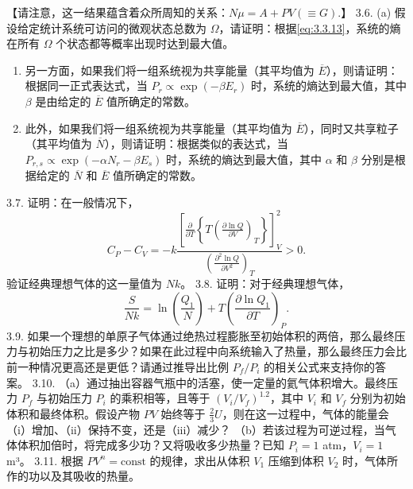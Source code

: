 【请注意，这一结果蕴含着众所周知的关系：\(N\mu = A + PV(\equiv G).\)】
3.6. (a) 假设给定统计系统可访问的微观状态总数为 \(\Omega\)，请证明：根据\autoref{eq:3.3.13}，系统的熵在所有 \(\Omega\) 个状态都等概率出现时达到最大值。
\begin{enumerate}
\def\labelenumi{(\alph{enumi})}
\setcounter{enumi}{1}
\item
  另一方面，如果我们将一组系统视为共享能量（其平均值为 \(\overline{E}\)），则请证明：根据同一正式表达式，当 \(P_{r} \propto \exp(-\beta E_{r})\) 时，系统的熵达到最大值，其中 \(\beta\) 是由给定的 \(\overline{E}\) 值所确定的常数。
\item
  此外，如果我们将一组系统视为共享能量（其平均值为 \(\overline{E}\)），同时又共享粒子（其平均值为 \(\overline{N}\)），则请证明：根据类似的表达式，当 \(P_{r,s} \propto \exp(-\alpha N_{r}-\beta E_{s})\) 时，系统的熵达到最大值，其中 \(\alpha\) 和 \(\beta\) 分别是根据给定的 \(\overline{N}\) 和 \(\overline{E}\) 值所确定的常数。
\end{enumerate}
3.7. 证明：在一般情况下，
\begin{equation}\tag{3.5.122}\label{eq:3.5.122}
C _ { P } - C _ { V } = - k \frac { \left[ \frac { \partial } { \partial T } \left\{ T \left( \frac { \partial \ln Q } { \partial V } \right) _ { T } \right\} \right] _ { V } ^{2} } { \left( \frac { \partial ^{2} \ln Q } { \partial V ^{2} } \right) _ { T } } > 0 .
\end{equation}
验证经典理想气体的这一量值为 \(Nk\)。
3.8. 证明：对于经典理想气体，
\begin{equation}\tag{3.5.123}\label{eq:3.5.123}
\frac { S } { N k } = \ln \left( \frac { Q _ { 1 } } { N } \right) + T \left( \frac { \partial \ln Q _ { 1 } } { \partial T } \right) _ { P } .
\end{equation}
3.9. 如果一个理想的单原子气体通过绝热过程膨胀至初始体积的两倍，那么最终压力与初始压力之比是多少？如果在此过程中向系统输入了热量，那么最终压力会比前一种情况更高还是更低？请通过推导出比例 \(P_{f}/P_{i}\) 的相关公式来支持你的答案。
3.10. （a）通过抽出容器气瓶中的活塞，使一定量的氦气体积增大。最终压力 \(P_{f}\) 与初始压力 \(P_{i}\) 的乘积相等，且等于 \((V_{i}/V_{f})^{1.2}\)，其中 \(V_{i}\) 和 \(V_{f}\) 分别为初始体积和最终体积。假设产物 \(PV\) 始终等于 \(\frac{2}{3}U\)，则在这一过程中，气体的能量会（i）增加、（ii）保持不变，还是（iii）减少？
（b）若该过程为可逆过程，当气体体积加倍时，将完成多少功？又将吸收多少热量？已知 \(P_{i}=1\) atm，\(V_{i}=1\) m³。
3.11. 根据 \(PV^n = \text{const}\) 的规律，求出从体积 \(V_1\) 压缩到体积 \(V_2\) 时，气体所作的功以及其吸收的热量。

